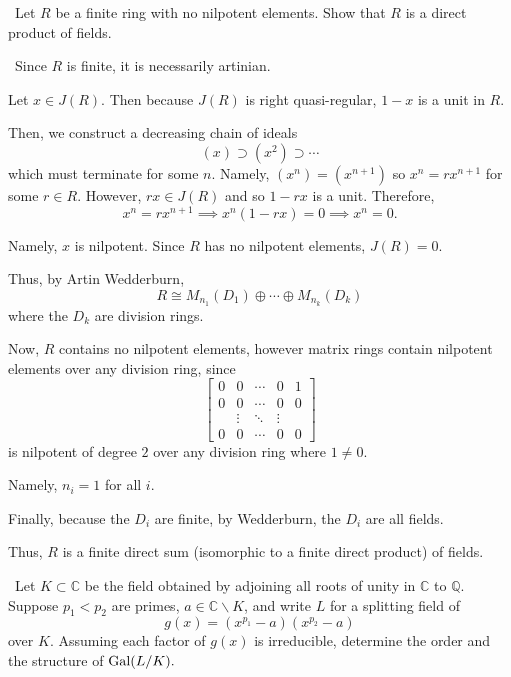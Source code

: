 \documentclass[12pt]{Qual}
\begin{document}
\begin{problem} $\,$
Let $R$ be a finite ring with no nilpotent elements. Show that $R$ is a direct product of fields.
\end{problem}


\begin{solution}$\,$
Since $R$ is finite, it is necessarily artinian.

Let $x\in J(R)$. Then because $J(R)$ is right quasi-regular, $1-x$ is a unit in $R$.

Then, we construct a decreasing chain of ideals $$(x)\supset (x^2)\supset\cdots$$ which must terminate for some $n$. Namely, $(x^n)=(x^{n+1})$ so $x^n=rx^{n+1}$ for some $r\in R$. However, $rx\in J(R)$ and so $1-rx$ is a unit. Therefore, $$x^n=rx^{n+1}\implies x^n(1-rx)=0\implies x^n=0.$$

Namely, $x$ is nilpotent. Since $R$ has no nilpotent elements, $J(R)=0.$

Thus, by Artin Wedderburn, $$R\cong M_{n_1}(D_1)\oplus\cdots\oplus M_{n_k}(D_k)$$ where the $D_k$ are division rings.

Now, $R$ contains no nilpotent elements, however matrix rings contain nilpotent elements over any division ring, since $$\begin{bmatrix}
0 & 0 &\cdots & 0 & 1\\
0 & 0 &\cdots & 0 & 0\\
& \vdots &\ddots & \vdots &\\
0 & 0 &\cdots & 0 & 0
\end{bmatrix}$$ is nilpotent of degree $2$ over any division ring where $1\not=0$.

Namely, $n_i=1$ for all $i$.

Finally, because the $D_i$ are finite, by Wedderburn, the $D_i$ are all fields.

Thus, $R$ is a finite direct sum (isomorphic to a finite direct product) of fields.
\end{solution}
\newpage



\begin{problem} $\,$
Let $K\subset\mathbb{C}$ be the field obtained by adjoining all roots of unity in $\mathbb{C}$ to $\mathbb{Q}$. Suppose $p_1<p_2$ are primes, $a\in\mathbb{C}\backslash K$, and write $L$ for a splitting field of $$g(x)=(x^{p_1}-a)(x^{p_2}-a)$$ over $K.$ Assuming each factor of $g(x)$ is irreducible, determine the order and the structure of $\text{Gal}(L/K).$
\end{problem}
\end{document}
